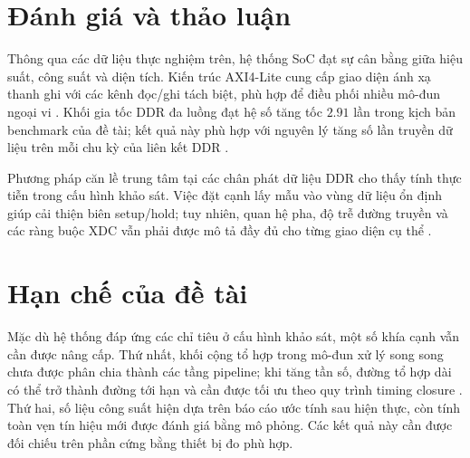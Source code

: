 \section{Đánh giá và thảo luận}
Thông qua các dữ liệu thực nghiệm trên, hệ thống SoC đạt sự cân bằng giữa hiệu suất, công suất và diện tích. Kiến trúc AXI4-Lite cung cấp giao diện ánh xạ thanh ghi với các kênh đọc/ghi tách biệt, phù hợp để điều phối nhiều mô-đun ngoại vi \cite{arm_axi4_spec,emil2023axiinterconnect}. Khối gia tốc DDR đa luồng đạt hệ số tăng tốc $2.91$ lần trong kịch bản benchmark của đề tài; kết quả này phù hợp với nguyên lý tăng số lần truyền dữ liệu trên mỗi chu kỳ của liên kết DDR \cite{psarras2017nocddr,jedec_ddr}.

Phương pháp căn lề trung tâm tại các chân phát dữ liệu DDR cho thấy tính thực tiễn trong cấu hình khảo sát. Việc đặt cạnh lấy mẫu vào vùng dữ liệu ổn định giúp cải thiện biên setup/hold; tuy nhiên, quan hệ pha, độ trễ đường truyền và các ràng buộc XDC vẫn phải được mô tả đầy đủ cho từng giao diện cụ thể \cite{arumugham2000ddrtiming,amd_ug903,amd_ug471}.

\section{Hạn chế của đề tài}
Mặc dù hệ thống đáp ứng các chỉ tiêu ở cấu hình khảo sát, một số khía cạnh vẫn cần được nâng cấp. Thứ nhất, khối cộng tổ hợp trong mô-đun xử lý song song chưa được phân chia thành các tầng pipeline; khi tăng tần số, đường tổ hợp dài có thể trở thành đường tới hạn và cần được tối ưu theo quy trình timing closure \cite{amd_ug949}. Thứ hai, số liệu công suất hiện dựa trên báo cáo ước tính sau hiện thực, còn tính toàn vẹn tín hiệu mới được đánh giá bằng mô phỏng. Các kết quả này cần được đối chiếu trên phần cứng bằng thiết bị đo phù hợp.
